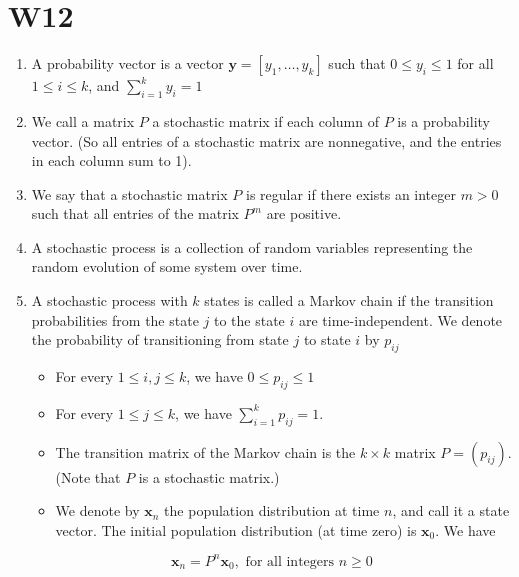\documentclass[10pt]{article}
\begin{document}
\newpage


\section{W12}
\begin{enumerate}
  \item A probability vector is a vector $\mathbf{y}=\left[y_{1}, \ldots, y_{k}\right]$ such that $0 \leq y_{i} \leq 1$ for all $1 \leq i \leq k$, and $\sum_{i=1}^{k} y_{i}=1$

  \item We call a matrix $P$ a stochastic matrix if each column of $P$ is a probability vector. (So all entries of a stochastic matrix are nonnegative, and the entries in each column sum to 1).

  \item We say that a stochastic matrix $P$ is regular if there exists an integer $m>0$ such that all entries of the matrix $P^{m}$ are positive.

  \item A stochastic process is a collection of random variables representing the random evolution of some system over time.

  \item A stochastic process with $k$ states is called a Markov chain if the transition probabilities from the state $j$ to the state $i$ are time-independent. We denote the probability of transitioning from state $j$ to state $i$ by $p_{i j}$

\begin{itemize}
  \item For every $1 \leq i, j \leq k$, we have $0 \leq p_{i j} \leq 1$

  \item For every $1 \leq j \leq k$, we have $\sum_{i=1}^{k} p_{i j}=1$.

  \item The transition matrix of the Markov chain is the $k \times k$ matrix $P=\left(p_{i j}\right)$. (Note that $P$ is a stochastic matrix.)

  \item We denote by $\mathbf{x}_{n}$ the population distribution at time $n$, and call it a state vector. The initial population distribution (at time zero) is $\mathbf{x}_{0}$. We have

\end{itemize}

$$
\mathbf{x}_{n}=P^{n} \mathbf{x}_{0}, \text { for all integers } n \geq 0
$$


\end{enumerate}
\end{document}
